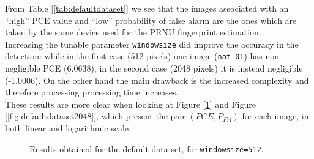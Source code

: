 \documentclass[a4paper, 12pt]{article}
\begin{document}
From Table [\ref{tab:defaultdataset}] we see that the images associated with an ``high'' PCE value and ``low'' probability of false alarm are the ones which are taken by the same device used for the PRNU fingerprint estimation.\\
Increasing the tunable parameter \texttt{windowsize} did improve the accuracy in the detection: while in the first case (512 pixels) one image (\texttt{nat\_01}) has non-negligible PCE (6.0638), in the second case (2048 pixels) it is instead negligible (-1.0006). On the other hand the main drawback is the increased complexity and therefore processing processing time increases.\\
These results are more clear when looking at Figure [\ref{fig:defaultdataset512}] and Figure [\ref{fig:defaultdataset2048}], which present the pair $(PCE,P_{FA})$ for each image, in both linear and logarithmic scale.

\begin{figure}[H]
	\centering
	\caption{Results obtained for the default data set, for \texttt{windowsize=512}.}
	\label{fig:defaultdataset512}
\end{figure}
\end{document}
